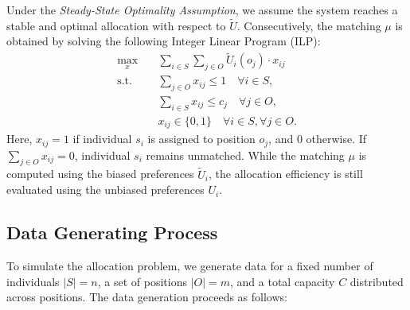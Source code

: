 \documentclass[letterpaper]{article}
\begin{document}
Under the \textit{Steady-State Optimality Assumption}, we assume the system reaches a stable and optimal allocation with respect to \( \tilde{U} \). Consecutively, the matching \( \mu \) is obtained by solving the following Integer Linear Program (ILP):
\begin{align*}
\max_{x} \quad & \sum_{i \in S} \sum_{j \in O} \tilde{U}_i(o_j) \cdot x_{ij} \\
\text{s.t.} \quad & \sum_{j \in O} x_{ij} \leq 1 \quad \forall i \in S, \\
& \sum_{i \in S} x_{ij} \leq c_j \quad \forall j \in O, \\
& x_{ij} \in \{0, 1\} \quad \forall i \in S, \forall j \in O.
\end{align*}
Here, \( x_{ij} = 1 \) if individual \( s_i \) is assigned to position \( o_j \), and \( 0 \) otherwise. If \( \sum_{j \in O} x_{ij} = 0 \), individual \( s_i \) remains unmatched. While the matching \( \mu \) is computed using the biased preferences \( \tilde{U}_i \), the allocation efficiency is still evaluated using the unbiased preferences \( U_i \).

\subsection*{Data Generating Process}

To simulate the allocation problem, we generate data for a fixed number of individuals \( |S| = n \), a set of positions \( |O| = m \), and a total capacity \( C \) distributed across positions. The data generation proceeds as follows:
\end{document}

